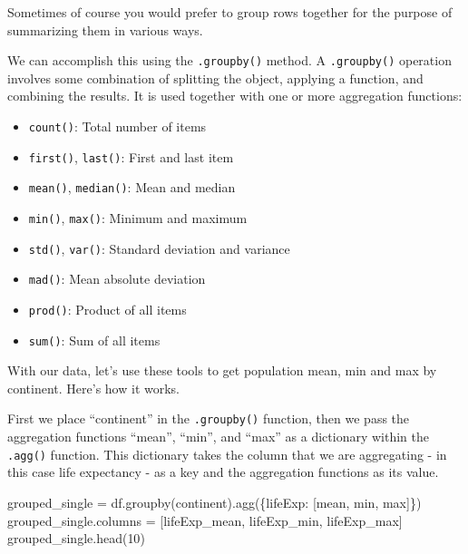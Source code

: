 \documentclass[
  letterpaper,
  DIV=11,
  numbers=noendperiod]{scrreprt}
\newenvironment{Shaded}{\begin{snugshade}}{\end{snugshade}}
\newcommand{\DecValTok}[1]{\textcolor[rgb]{0.68,0.00,0.00}{#1}}
\newcommand{\NormalTok}[1]{\textcolor[rgb]{0.00,0.23,0.31}{#1}}
\newcommand{\OperatorTok}[1]{\textcolor[rgb]{0.37,0.37,0.37}{#1}}
\newcommand{\StringTok}[1]{\textcolor[rgb]{0.13,0.47,0.30}{#1}}
\providecommand{\tightlist}{%
  \setlength{\itemsep}{0pt}\setlength{\parskip}{0pt}}\usepackage{longtable,booktabs,array}
\begin{document}
Sometimes of course you would prefer to group rows together for the
purpose of summarizing them in various ways.

We can accomplish this using the \texttt{.groupby()} method. A
\texttt{.groupby()} operation involves some combination of splitting the
object, applying a function, and combining the results. It is used
together with one or more aggregation functions:

\begin{itemize}
\tightlist
\item
  \texttt{count()}: Total number of items
\item
  \texttt{first()}, \texttt{last()}: First and last item
\item
  \texttt{mean()}, \texttt{median()}: Mean and median
\item
  \texttt{min()}, \texttt{max()}: Minimum and maximum
\item
  \texttt{std()}, \texttt{var()}: Standard deviation and variance
\item
  \texttt{mad()}: Mean absolute deviation
\item
  \texttt{prod()}: Product of all items
\item
  \texttt{sum()}: Sum of all items
\end{itemize}

With our data, let's use these tools to get population mean, min and max
by continent. Here's how it works.

First we place ``continent'' in the \texttt{.groupby()} function, then
we pass the aggregation functions ``mean'', ``min'', and ``max'' as a
dictionary within the \texttt{.agg()} function. This dictionary takes
the column that we are aggregating - in this case life expectancy - as a
key and the aggregation functions as its value.

\begin{Shaded}
\begin{Highlighting}[]
\NormalTok{grouped\_single }\OperatorTok{=}\NormalTok{ df.groupby(}\StringTok{\textquotesingle{}continent\textquotesingle{}}\NormalTok{).agg(\{}\StringTok{\textquotesingle{}lifeExp\textquotesingle{}}\NormalTok{: [}\StringTok{\textquotesingle{}mean\textquotesingle{}}\NormalTok{, }\StringTok{\textquotesingle{}min\textquotesingle{}}\NormalTok{, }\StringTok{\textquotesingle{}max\textquotesingle{}}\NormalTok{]\})}
\NormalTok{grouped\_single.columns }\OperatorTok{=}\NormalTok{ [}\StringTok{\textquotesingle{}lifeExp\_mean\textquotesingle{}}\NormalTok{, }\StringTok{\textquotesingle{}lifeExp\_min\textquotesingle{}}\NormalTok{, }\StringTok{\textquotesingle{}lifeExp\_max\textquotesingle{}}\NormalTok{]}
\NormalTok{grouped\_single.head(}\DecValTok{10}\NormalTok{)}
\end{Highlighting}
\end{Shaded}
\end{document}
